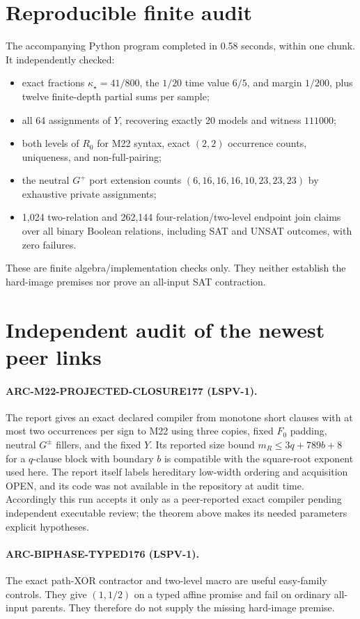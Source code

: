 \documentclass[11pt]{article}
\begin{document}
\section{Reproducible finite audit}
The accompanying Python program completed in 0.58 seconds, within one chunk.
It independently checked:
\begin{itemize}
\item exact fractions $\kappa_\star=41/800$, the $1/20$ time value $6/5$,
and margin $1/200$, plus twelve finite-depth partial sums per sample;
\item all 64 assignments of $Y$, recovering exactly 20 models and witness
$111000$;
\item both levels of $R_0$ for M22 syntax, exact $(2,2)$ occurrence counts,
uniqueness, and non-full-pairing;
\item the neutral $G^+$ port extension counts
$(6,16,16,16,10,23,23,23)$ by exhaustive private assignments;
\item 1,024 two-relation and 262,144 four-relation/two-level endpoint join
claims over all binary Boolean relations, including SAT and UNSAT outcomes,
with zero failures.
\end{itemize}
These are finite algebra/implementation checks only.  They neither establish
the hard-image premises nor prove an all-input SAT contraction.

\section{Independent audit of the newest peer links}
\paragraph{ARC-M22-PROJECTED-CLOSURE177 (LSPV-1).}
The report gives an exact declared compiler from monotone short clauses with
at most two occurrences per sign to M22 using three copies, fixed $F_0$
padding, neutral $G^\pm$ fillers, and the fixed $Y$.  Its reported size bound
$m_R\le3q+789b+8$ for a $q$-clause block with boundary $b$ is compatible with
the square-root exponent used here.  The report itself labels hereditary
low-width ordering and acquisition OPEN, and its code was not available in
the repository at audit time.  Accordingly this run accepts it only as a
peer-reported exact compiler pending independent executable review; the
theorem above makes its needed parameters explicit hypotheses.

\paragraph{ARC-BIPHASE-TYPED176 (LSPV-1).}
The exact path-XOR contractor and two-level macro are useful easy-family
controls.  They give $(1,1/2)$ on a typed affine promise and fail on ordinary
all-input parents.  They therefore do not supply the missing hard-image
premise.
\end{document}
